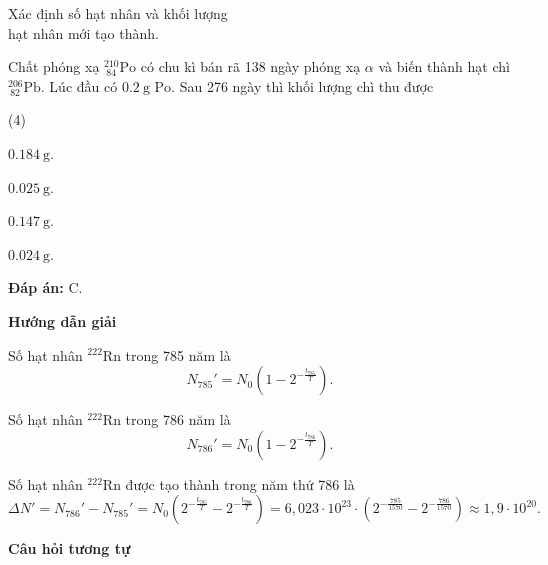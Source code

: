 \begin{dang}{Xác định số hạt nhân và khối lượng\\ hạt nhân mới tạo thành.}
{		Chất phóng xạ $^{210}_{\ 84}\text{Po}$ có chu kì bán rã 138 ngày phóng xạ $\alpha$ và biến thành hạt chì $^{206}_{\ 82}\text{Pb}$. Lúc đầu có $\SI{0,2}{\gram}$ $\text{Po}$. Sau 276 ngày thì khối lượng chì thu được
		\begin{mcq}(4)
			\item $\SI{0,184}{\gram}$.
			\item $\SI{0,025}{\gram}$.
			\item $\SI{0,147}{\gram}$.
			\item $\SI{0,024}{\gram}$.
		\end{mcq}
		
		\textbf{Đáp án:} C.}
	
	{
		\begin{center}
			\textbf{Hướng dẫn giải}
		\end{center}
		
		Số hạt nhân $^{222}\text{Rn}$ trong 785 năm là
		\begin{equation*}
			N_{785}'= N_0\left( 1-2^{-\frac{t_{785}}{T}}\right).
		\end{equation*}
		
		Số hạt nhân $^{222}\text{Rn}$ trong 786 năm là
		\begin{equation*}
			N_{786}'= N_0\left( 1-2^{-\frac{t_{786}}{T}}\right).
		\end{equation*}
		
		Số hạt nhân $^{222}\text{Rn}$ được tạo thành trong năm thứ 786 là
		\begin{equation*}
			\Delta N'= N_{786}'-N_{785}' =  N_0\left(2^{-\frac{t_{785}}{T}}-2^{-\frac{t_{786}}{T}}\right)=6,023\cdot10^{23}\cdot\left(2^{-\frac{785}{1570}}-2^{-\frac{786}{1570}}\right)\approx 1,9\cdot10^{20}.
		\end{equation*}
		
		\begin{center}
			\textbf{Câu hỏi tương tự}
		\end{center}
		
}
\end{dang}

